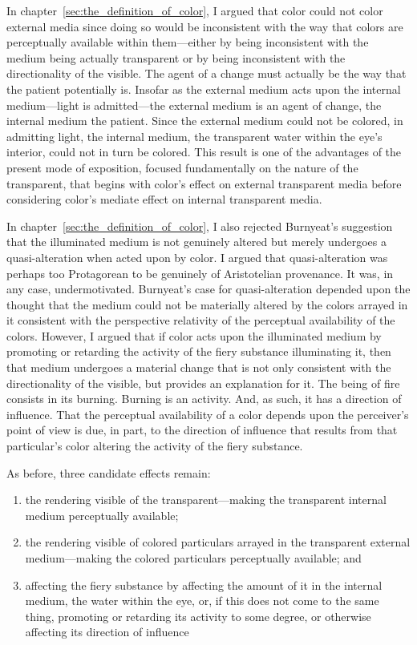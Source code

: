 In chapter~\ref{sec:the_definition_of_color}, I argued that color could not color external media since doing so would be inconsistent with the way that colors are perceptually available within them---either by being inconsistent with the medium being actually transparent or by being inconsistent with the directionality of the visible. The agent of a change must actually be the way that the patient potentially is. Insofar as the external medium acts upon the internal medium---light is admitted---the external medium is an agent of change, the internal medium the patient. Since the external medium could not be colored, in admitting light, the internal medium, the transparent water within the eye's interior, could not in turn be colored. This result is one of the advantages of the present mode of exposition, focused fundamentally on the nature of the transparent, that begins with color's effect on external transparent media before considering color's mediate effect on internal transparent media.

In chapter~\ref{sec:the_definition_of_color}, I also rejected Burnyeat's suggestion that the illuminated medium is not genuinely altered but merely undergoes a quasi-alteration when acted upon by color. I argued that quasi-alteration was perhaps too Protagorean to be genuinely of Aristotelian provenance. It was, in any case, undermotivated. Burnyeat's case for quasi-alteration depended upon the thought that the medium could not be materially altered by the colors arrayed in it consistent with the perspective relativity of the perceptual availability of the colors. However, I argued that if color acts upon the illuminated medium by promoting or retarding the activity of the fiery substance illuminating it, then that medium undergoes a material change that is not only consistent with the directionality of the visible, but provides an explanation for it. The being of fire consists in its burning. Burning is an activity. And, as such, it has a direction of influence. That the perceptual availability of a color depends upon the perceiver’s point of view is due, in part, to the direction of influence that results from that particular’s color altering the activity of the fiery substance. 

As before, three candidate effects remain:
\begin{enumerate}[(1)]
	\item the rendering visible of the transparent---making the transparent internal me\-di\-um perceptually available;
	\item the rendering visible of colored particulars arrayed in the transparent external me\-di\-um\----making the colored particulars perceptually available; and
	\item affecting the fiery substance by affecting the amount of it in the internal me\-di\-um, the water within the eye, or, if this does not come to the same thing, promoting or retarding its activity to some degree, or otherwise affecting its direction of influence
\end{enumerate}

